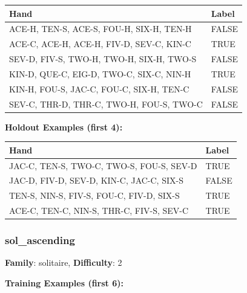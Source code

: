 \documentclass[10pt,a4paper]{article}
\begin{document}
\begin{small}
\begin{tabular}{p{8cm}l}
\toprule
Hand & Label \\
\midrule
ACE-H, TEN-S, ACE-S, FOU-H, SIX-H, TEN-H & \textcolor{negative}{FALSE} \\
ACE-C, ACE-H, ACE-H, FIV-D, SEV-C, KIN-C & \textcolor{positive}{TRUE} \\
SEV-D, FIV-S, TWO-H, TWO-H, SIX-H, TWO-S & \textcolor{negative}{FALSE} \\
KIN-D, QUE-C, EIG-D, TWO-C, SIX-C, NIN-H & \textcolor{positive}{TRUE} \\
KIN-H, FOU-S, JAC-C, FOU-C, SIX-H, TEN-C & \textcolor{negative}{FALSE} \\
SEV-C, THR-D, THR-C, TWO-H, FOU-S, TWO-C & \textcolor{negative}{FALSE} \\
\bottomrule
\end{tabular}
\end{small}

\textbf{Holdout Examples (first 4):}

\begin{small}
\begin{tabular}{p{8cm}l}
\toprule
Hand & Label \\
\midrule
JAC-C, TEN-S, TWO-C, TWO-S, FOU-S, SEV-D & \textcolor{positive}{TRUE} \\
JAC-D, FIV-D, SEV-D, KIN-C, JAC-C, SIX-S & \textcolor{negative}{FALSE} \\
TEN-S, NIN-S, FIV-S, FOU-C, FIV-D, SIX-S & \textcolor{positive}{TRUE} \\
ACE-C, TEN-C, NIN-S, THR-C, FIV-S, SEV-C & \textcolor{positive}{TRUE} \\
\bottomrule
\end{tabular}
\end{small}

\vspace{0.5cm}

\subsubsection{sol\_ascending}

\textbf{Family}: solitaire, \textbf{Difficulty}: 2

\textbf{Training Examples (first 6):}
\end{document}
